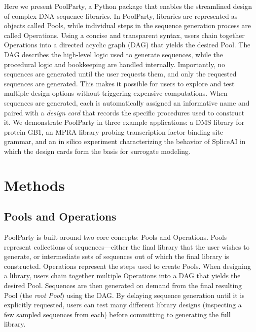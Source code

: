 \documentclass[unnumsec,webpdf,modern,large]{mam-authoring-template}%
\theoremstyle{thmstyleone}%
\theoremstyle{thmstyletwo}%
\theoremstyle{thmstylethree}%
\begin{document}
Here we present PoolParty, a Python package that enables the streamlined design of complex DNA sequence libraries. In PoolParty, libraries are represented as objects called Pools, while individual steps in the sequence generation process are called Operations. Using a concise and transparent syntax, users chain together Operations into a directed acyclic graph (DAG) that yields the desired Pool. The DAG describes the high-level logic used to generate sequences, while the procedural logic and bookkeeping are handled internally. Importantly, no sequences are generated until the user requests them, and only the requested sequences are generated. This makes it possible for users to explore and test multiple design options without triggering expensive computations. When sequences are generated, each is automatically assigned an informative name and paired with a \emph{design card} that records the specific procedures used to construct it. We demonstrate PoolParty in three example applications: a DMS library for protein GB1, an MPRA library probing transcription factor binding site grammar, and an in silico experiment characterizing the behavior of SpliceAI \citep{Jaganathan2019ps} in which the design cards form the basis for surrogate modeling.

\section{Methods}

\subsection{Pools and Operations}

PoolParty is built around two core concepts: Pools and Operations. Pools represent collections of sequences---either the final library that the user wishes to generate, or intermediate sets of sequences out of which the final library is constructed. Operations represent the steps used to create Pools. When designing a library, users chain together multiple Operations into a DAG that yields the desired Pool. Sequences are then generated on demand from the final resulting Pool (the \emph{root Pool}) using the DAG. By delaying sequence generation until it is explicitly requested, users can test many different library designs (inspecting a few sampled sequences from each) before committing to generating the full library.  
\end{document}

